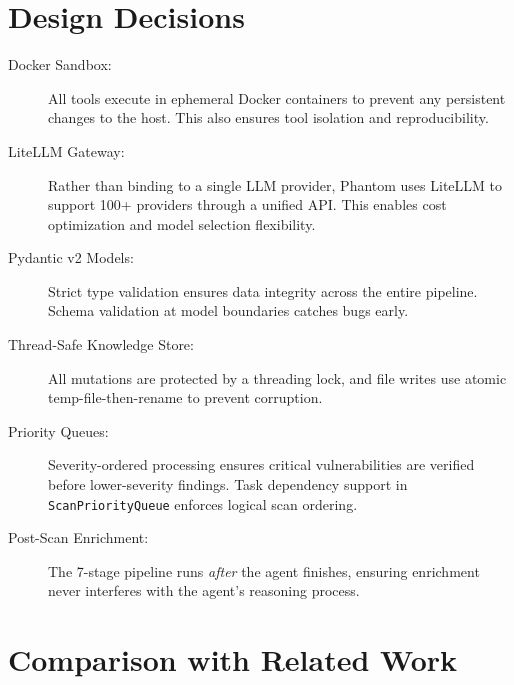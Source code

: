 \documentclass[12pt,a4paper]{article}
\begin{document}
\section{Design Decisions}

\begin{description}
    \item[Docker Sandbox:] All tools execute in ephemeral Docker containers
        to prevent any persistent changes to the host. This also ensures
        tool isolation and reproducibility.

    \item[LiteLLM Gateway:] Rather than binding to a single LLM provider,
        Phantom uses LiteLLM to support 100+ providers through a unified API.
        This enables cost optimization and model selection flexibility.

    \item[Pydantic v2 Models:] Strict type validation ensures data integrity
        across the entire pipeline. Schema validation at model boundaries
        catches bugs early.

    \item[Thread-Safe Knowledge Store:] All mutations are protected by a
        threading lock, and file writes use atomic temp-file-then-rename
        to prevent corruption.

    \item[Priority Queues:] Severity-ordered processing ensures critical
        vulnerabilities are verified before lower-severity findings.
        Task dependency support in \texttt{ScanPriorityQueue} enforces
        logical scan ordering.

    \item[Post-Scan Enrichment:] The 7-stage pipeline runs \textit{after}
        the agent finishes, ensuring enrichment never interferes with
        the agent's reasoning process.
\end{description}

\section{Comparison with Related Work}
\end{document}
